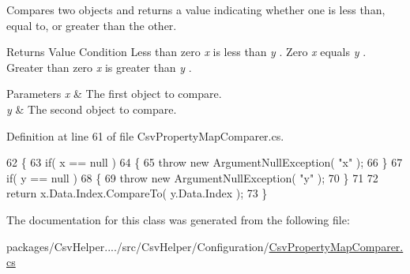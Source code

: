 Compares two objects and returns a value indicating whether one is less than, equal to, or greater than the other. 

\begin{DoxyReturn}{Returns}
Value Condition Less than zero {\itshape x}  is less than {\itshape y} . Zero {\itshape x}  equals {\itshape y} . Greater than zero {\itshape x}  is greater than {\itshape y} . 
\end{DoxyReturn}

\begin{DoxyParams}{Parameters}
{\em x} & The first object to compare. \\
\hline
{\em y} & The second object to compare. \\
\hline
\end{DoxyParams}


Definition at line 61 of file Csv\-Property\-Map\-Comparer.\-cs.


\begin{DoxyCode}
62         \{
63             \textcolor{keywordflow}{if}( x == null )
64             \{
65                 \textcolor{keywordflow}{throw} \textcolor{keyword}{new} ArgumentNullException( \textcolor{stringliteral}{"x"} );
66             \}
67             \textcolor{keywordflow}{if}( y == null )
68             \{
69                 \textcolor{keywordflow}{throw} \textcolor{keyword}{new} ArgumentNullException( \textcolor{stringliteral}{"y"} );
70             \}
71 
72             \textcolor{keywordflow}{return} x.Data.Index.CompareTo( y.Data.Index );
73         \}
\end{DoxyCode}


The documentation for this class was generated from the following file\-:\begin{DoxyCompactItemize}
\item 
packages/\-Csv\-Helper..../src/\-Csv\-Helper/\-Configuration/\hyperlink{a00221}{Csv\-Property\-Map\-Comparer.\-cs}\end{DoxyCompactItemize}
